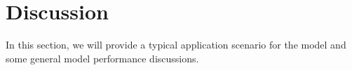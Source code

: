 \documentclass[a4paper,fleqn]{cas-sc}
\begin{document}




\section{Discussion}\label{Discussion}

In this section, we will provide a typical application scenario for the model and some general model performance discussions. 
\end{document}
